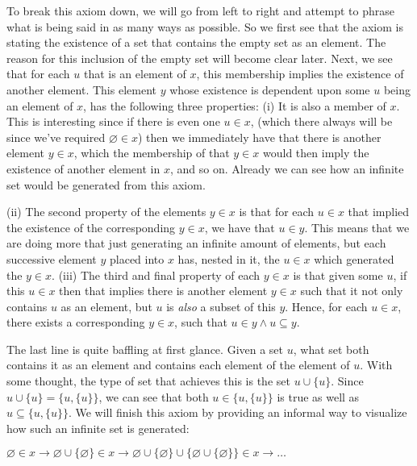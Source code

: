 \documentclass[12pt, a4paper]{article}
\begin{document}
\begin{description}
To break this axiom down, we will go from left to right and attempt to phrase what is being said in as many ways as possible. So we first see that the axiom is stating the existence of a set that contains the empty set as an element. The reason for this inclusion of the empty set will become clear later. Next, we see that for each $u$ that is an element of $x$, this membership implies the existence of another element. This element $y$ whose existence is dependent upon some $u$ being an element of $x$, has the following three properties: (i) It is also a member of $x$. This is interesting since if there is even one $u\in x$, (which there always will be since we've required $\varnothing\in x$) then we immediately have that there is another element $y\in x$, which the membership of that $y\in x$ would then imply the existence of another element in $x$, and so on. Already we can see how an infinite set would be generated from this axiom.\par

(ii) The second property of the elements $y\in x$ is that for each $u\in x$ that implied the existence of the corresponding $y\in x$, we have that $u\in y$. This means that we are doing more that just generating an infinite amount of elements, but each successive element $y$ placed into $x$ has, nested in it, the $u\in x$ which generated the $y\in x$. (iii) The third and final property of each $y\in x$ is that given some $u$, if this $u\in x$ then that implies there is another element $y\in x$ such that it not only contains $u$ as an element, but $u$ is \textit{also} a subset of this $y$. Hence, for each $u\in x$, there exists a corresponding $y\in x$, such that $u\in y\wedge u\subseteq y$.\par

The last line is quite baffling at first glance. Given a set $u$, what set both contains it as an element and contains each element of the element of $u$. With some thought, the type of set that achieves this is the set $u\cup\{u\}$. Since $u\cup\{u\}=\{u,\{u\}\}$, we can see that both $u\in\{u,\{u\}\}$ is true as well as $u\subseteq\{u,\{u\}\}$. We will finish this axiom by providing an informal way to visualize how such an infinite set is generated:\par

\vspace{4mm}

\centerline{$\varnothing\in x\rightarrow\varnothing\cup\{\varnothing\}\in x\rightarrow\varnothing\cup\{\varnothing\}\cup\{\varnothing\cup\{\varnothing\}\}\in x\rightarrow\dots$}


\end{description}
\end{document}
